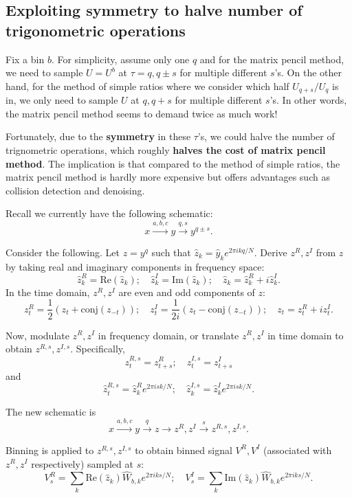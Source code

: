 \documentclass[10pt]{article}
\begin{document}
\subsection{Exploiting symmetry to halve number of trigonometric operations}

Fix a bin $b$. For simplicity, assume only one $q$ and for the matrix pencil method, we need to sample $U=U^b$ at $\tau=q, q\pm s$ for multiple different $s$'s. On the other hand, for the method of simple ratios where we consider which half $U_{q+s}/U_q$ is in, we only need to sample $U$ at $q, q+s$ for multiple different $s$'s. In other words, the matrix pencil method seems to demand twice as much work!

Fortunately, due to the \textbf{symmetry} in these $\tau$'s, we could halve the number of trignometric operations, which roughly \textbf{halves the cost of matrix pencil method}. The implication is that compared to the method of simple ratios, the matrix pencil method is hardly more expensive but offers advantages such as collision detection and denoising.

Recall we currently have the following schematic:
$$x \xrightarrow{a,b,c}{y} \xrightarrow{q,s} y^{q\pm s}.$$

Consider the following. Let $z=y^q$ such that $\hat{z}_k = \hat{y}_k e^{2\pi i k q/N}$. Derive $z^R, z^I$ from $z$ by taking real and imaginary components in frequency space:
$$\hat{z}^R_k=\text{Re}(\hat{z}_k); \quad \hat{z}^I_k = \text{Im}(\hat{z}_k); \quad \hat{z}_k = \hat{z}_k^R + i \hat{z}_k^I.$$
In the time domain, $z^R,z^I$ are even and odd components of $z$:
$$z^R_t = \frac{1}{2}(z_t + \text{conj}(z_{-t})); \quad z^I_t = \frac{1}{2i}(z_t - \text{conj}(z_{-t})); \quad z_t = z_t^R + i z_t^I.$$

Now, modulate $z^R, z^I$ in frequency domain, or translate $z^R,z^I$ in time domain to obtain $z^{R,s}, z^{I,s}$. Specifically,
$$z^{R,s}_{t}=z^R_{t+s}; \quad z^{I,s}_{t}=z^I_{t+s}$$
and
$$\hat{z}^{R,s}_{t}=\hat{z}^R_{k}e^{2\pi i s k/N}; \quad \hat{z}^{I,s}_{k}=\hat{z}^I_{k} e^{2\pi i sk/N}.$$

The new schematic is
$$x \xrightarrow{a,b,c}{y} \xrightarrow{q} z \rightarrow z^R, z^I \xrightarrow{s} z^{R,s}, z^{I,s}.$$

Binning is applied to $z^{R,s}, z^{I,s}$ to obtain binned signal $V^R, V^I$ (associated with $z^R, z^I$ respectively) sampled at $s$:
$$V^{R}_s = \sum_k \text{Re}(\hat{z}_k) \hat{W}_{b,k} e^{2\pi i ks/N};\quad V^{I}_s = \sum_k \text{Im}(\hat{z}_k) \hat{W}_{b,k} e^{2\pi i ks/N}.$$
\end{document}
